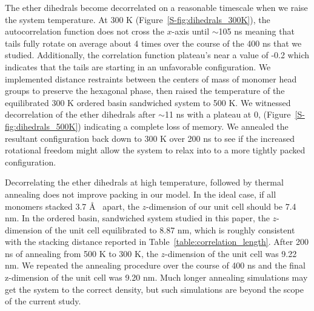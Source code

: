 \documentclass[journal=jpcbfk,manuscript=article]{achemso}
\begin{document}
  The ether dihedrals become decorrelated on a reasonable timescale when we raise
  the system temperature. At 300 K (Figure~\ref{S-fig:dihedrals_300K}), the autocorrelation function does
  not cross the $x$-axis until $\sim$105 ns meaning that tails fully rotate on average about 
  4 times over the course of the 400 ns that we studied. Additionally, the correlation 
  function plateau's near a value of -0.2 which indicates that the tails are starting in 
  an unfavorable configuration. We implemented distance restraints between the centers of 
  mass of monomer head groups to preserve the hexagonal phase, then raised the temperature 
  of the equilibrated 300 K ordered basin sandwiched system to 500 K. We witnessed 
  decorrelation of the ether dihedrals after $\sim$11 ns with a plateau at 0, 
  (Figure~\ref{S-fig:dihedrals_500K}) indicating a complete loss of memory. We annealed
  the resultant configuration back down to 300 K over 200 ns to see if the increased rotational
  freedom might allow the system to relax into to a more tightly packed configuration.
  
  Decorrelating the ether dihedrals at high temperature, followed by thermal annealing
  does not improve packing in our model. In the ideal case, if all monomers stacked 
  3.7 \AA~ apart, the $z$-dimension of our unit cell should be 7.4 nm. In the ordered basin, 
  sandwiched system studied in this paper, the $z$-dimension of the unit cell equilibrated 
  to 8.87 nm, which is roughly consistent with the stacking distance reported in 
  Table~\ref{table:correlation_length}. After 200 ns of annealing from 500 K to 300 K, the 
  $z$-dimension of the unit cell was 9.22 nm. We repeated the annealing procedure over the 
  course of 400 ns and the final z-dimension of the unit cell was 9.20 nm. Much longer
  annealing simulations may get the system to the correct density, but such simulations are beyond
  the scope of the current study.

  
\end{document}
